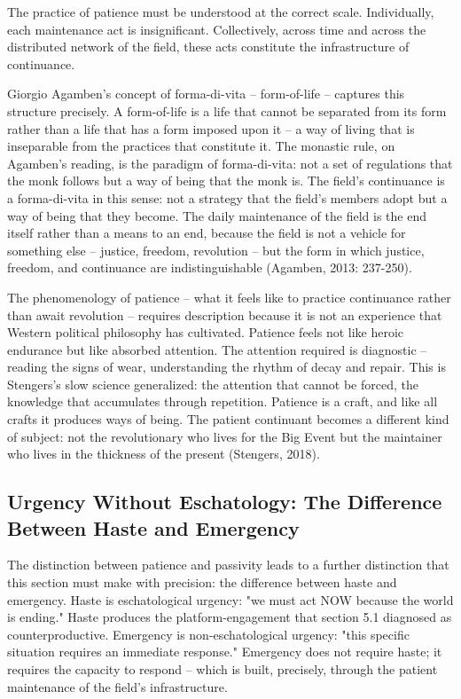 The practice of patience must be understood at the correct scale. Individually, each maintenance act is insignificant. Collectively, across time and across the distributed network of the field, these acts constitute the infrastructure of continuance.

Giorgio Agamben's concept of forma-di-vita -- form-of-life -- captures this structure precisely. A form-of-life is a life that cannot be separated from its form rather than a life that has a form imposed upon it -- a way of living that is inseparable from the practices that constitute it. The monastic rule, on Agamben's reading, is the paradigm of forma-di-vita: not a set of regulations that the monk follows but a way of being that the monk is. The field's continuance is a forma-di-vita in this sense: not a strategy that the field's members adopt but a way of being that they become. The daily maintenance of the field is the end itself rather than a means to an end, because the field is not a vehicle for something else -- justice, freedom, revolution -- but the form in which justice, freedom, and continuance are indistinguishable (Agamben, 2013: 237-250).

The phenomenology of patience -- what it feels like to practice continuance rather than await revolution -- requires description because it is not an experience that Western political philosophy has cultivated. Patience feels not like heroic endurance but like absorbed attention. The attention required is diagnostic -- reading the signs of wear, understanding the rhythm of decay and repair. This is Stengers's slow science generalized: the attention that cannot be forced, the knowledge that accumulates through repetition. Patience is a craft, and like all crafts it produces ways of being. The patient continuant becomes a different kind of subject: not the revolutionary who lives for the Big Event but the maintainer who lives in the thickness of the present (Stengers, 2018).

\subsection{Urgency Without Eschatology: The Difference Between Haste and Emergency}

The distinction between patience and passivity leads to a further distinction that this section must make with precision: the difference between haste and emergency. Haste is eschatological urgency: "we must act NOW because the world is ending." Haste produces the platform-engagement that section 5.1 diagnosed as counterproductive. Emergency is non-eschatological urgency: "this specific situation requires an immediate response." Emergency does not require haste; it requires the capacity to respond -- which is built, precisely, through the patient maintenance of the field's infrastructure.

